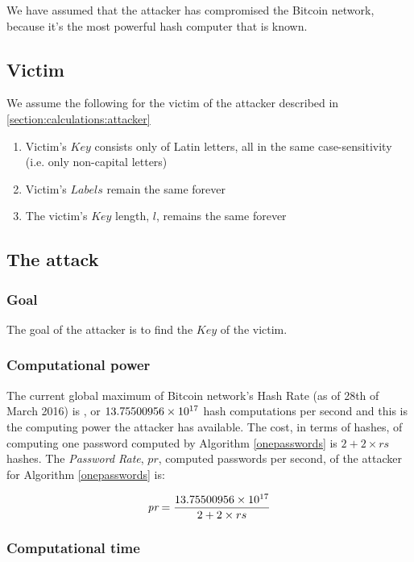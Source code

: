 \documentclass{sig-alternate}
\begin{document}
We have assumed that the attacker has compromised the Bitcoin network, because it's the most powerful hash computer that is known.

\subsection{Victim}
\label{section:calculations:victim}

We assume the following for the victim of the attacker described in \ref{section:calculations:attacker}

\begin{enumerate}
  \item Victim's $Key$ consists only of Latin letters, all in the same case-sensitivity (i.e. only non-capital letters)
  \item Victim's $Labels$ remain the same forever
  \item The victim's $Key$ length, $l$, remains the same forever
\end{enumerate}

\subsection{The attack}
\label{section:calculations:attack}

\subsubsection{Goal}
\label{section:attack:goal}

The goal of the attacker is to find the $Key$ of the victim.

\subsubsection{Computational power}
\label{section:attack:power}

The current global maximum of Bitcoin network's Hash Rate (as of 28th of March 2016) is \btchr \cite{btc:hashrate:2015},
or $13.75500956 \times 10^{17}$ hash computations per second and this is the computing power the attacker has available.
The cost, in terms of hashes, of computing one password computed by Algorithm \ref{onepasswords} is $2 + 2 \times rs$ hashes.
The \textit{Password Rate}, $pr$, computed passwords per second, of the attacker
for Algorithm \ref{onepasswords} is:

$$\textit{pr} = \frac{13.75500956 \times 10^{17}}{2 + 2 \times rs}$$

\subsubsection{Computational time}
\end{document}
